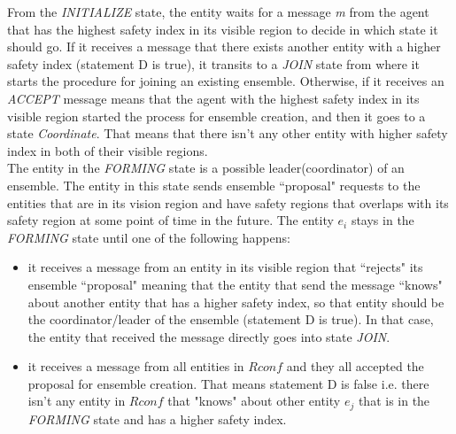 \documentclass[journal]{IEEEtran}
\theoremstyle{definition}
\newcommand{\ugh}[1]{\textcolor{red}{\uwave{#1}}} %
\newcommand\darko[1]{\nb{Darko}{#1}}
\begin{document}
From the \textit{INITIALIZE} state, the entity waits for a message \textit{m} from the agent that has the highest safety index in its visible region to decide in which state it should go. If it receives a message  that there exists another entity with a higher safety index (statement D is true), it transits to a \textit{JOIN} state from where it starts the procedure for joining an existing ensemble. 
Otherwise, if it receives an \textit{ACCEPT} message means that the agent with the highest safety index in its visible region started the process for ensemble creation, and then it goes to a state \textit{Coordinate}. That means that there isn't any other entity with higher safety index in both of their visible regions.\\
The entity in the \textit{FORMING} state is a possible leader(coordinator) of an ensemble. The entity in this state sends ensemble ``proposal" requests to the entities that are in its vision region and have safety regions that overlaps with its safety region at some point of time in the future.
The entity  $e_i$ stays in the \textit{FORMING} state until one of the following happens: 
\begin{itemize}
\item  it receives a message from an entity in its visible region that ``rejects" its ensemble ``proposal" meaning that the entity that send the message ``knows" about another entity that has a higher safety index, so that entity should be the coordinator/leader of the ensemble (statement D is true). In that case, the entity that received the message directly goes into state \textit{JOIN}.
\item it receives a message from all entities in $Rconf$ and they all accepted the proposal for ensemble creation.
That means statement D is false i.e. there isn't any entity in $Rconf$ that "knows" about other entity $e_j$ that
is in the \textit{FORMING} state and has a higher safety index.
\end{itemize}
\end{document}
